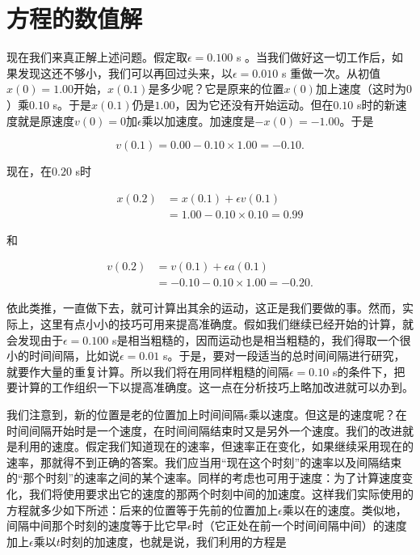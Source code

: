 \documentclass[12pt,oneside]{book}
\begin{document}
\section{方程的数值解}
现在我们来真正解上述问题。假定取$ \epsilon=0.100 $ s 。当我们做好这一切工作后，如果发现这还不够小，我们可以再回过头来，以$ \epsilon=0.010 $ s 重做一次。从初值$ x(0)=1.00 $开始，$ x(0.1) $是多少呢？它是原来的位置$ x(0) $加上速度（这时为$ 0 $）乘$ 0.10 $ s。于是$ x(0.1) $仍是$ 1.00 $，因为它还没有开始运动。但在$ 0.10 $ s时的新速度就是原速度$ v(0)=0 $加$ \epsilon $乘以加速度。加速度是$ -x(0)=-1.00 $。于是

\begin{equation*}
v(0.1) =0.00-0.10\times1.00=-0.10.
\end{equation*}

现在，在$ 0.20 $ s时

\begin{align*}
x(0.2) &=x(0.1)+\epsilon v(0.1)\\[1ex]
&=1.00-0.10\times0.10=0.99
\end{align*}

和

\begin{align*}
v(0.2) &=v(0.1)+\epsilon a(0.1)\\[1ex]
&=-0.10-0.10\times1.00=-0.20.
\end{align*}

依此类推，一直做下去，就可计算出其余的运动，这正是我们要做的事。然而，实际上，这里有点小小的技巧可用来提高准确度。假如我们继续已经开始的计算，就会发现由于$ \epsilon=0.100 $ s是相当粗糙的，因而运动也是相当粗糙的，我们得取一个很小的时间间隔，比如说$ \epsilon=0.01 $ s。于是，要对一段适当的总时间间隔进行研究，就要作大量的重复计算。所以我们将在用同样粗糙的间隔$ \epsilon=0.10  $ s的条件下，把要计算的工作组织一下以提高准确度。这一点在分析技巧上略加改进就可以办到。

我们注意到，新的位置是老的位置加上时间间隔$ \epsilon $乘以速度。但这是的速度呢？在时间间隔开始时是一个速度，在时间间隔结束时又是另外一个速度。我们的改进就是利用的速度。假定我们知道现在的速率，但速率正在变化，如果继续采用现在的速率，那就得不到正确的答案。我们应当用“现在这个时刻”的速率以及间隔结束的“那个时刻”的速率之间的某个速率。同样的考虑也可用于速度：为了计算速度变化，我们将使用要求出它的速度的那两个时刻中间的加速度。这样我们实际使用的方程就多少如下所述：后来的位置等于先前的位置加上$ \epsilon $乘以在的速度。类似地，间隔中间那个时刻的速度等于比它早$ \epsilon $时（它正处在前一个时间间隔中间）的速度加上$ \epsilon $乘以$ t $时刻的加速度，也就是说，我们利用的方程是
\end{document}
